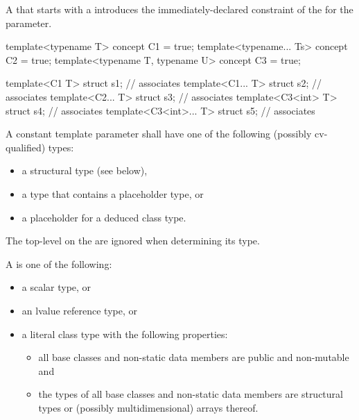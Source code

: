 \pnum
A  that starts with a 
introduces the immediately-declared constraint
of the  for the parameter.
\begin{example}
\begin{codeblock}
template<typename T> concept C1 = true;
template<typename... Ts> concept C2 = true;
template<typename T, typename U> concept C3 = true;

template<C1 T> struct s1;               // associates 
template<C1... T> struct s2;            // associates 
template<C2... T> struct s3;            // associates 
template<C3<int> T> struct s4;          // associates 
template<C3<int>... T> struct s5;       // associates 
\end{codeblock}
\end{example}

\pnum
A constant template parameter
shall have one of the following (possibly cv-qualified) types:
\begin{itemize}
\item a structural type (see below),
\item a type that contains a placeholder type, or
\item a placeholder for a deduced class type.
\end{itemize}
The top-level
on the
are ignored when determining its type.

\pnum
\label{term.structural.type}%
A  is one of the following:
\begin{itemize}
\item a scalar type, or
\item an lvalue reference type, or
\item a literal class type with the following properties:
\begin{itemize}
\item
all base classes and non-static data members are public and non-mutable and
\item
the types of all base classes and non-static data members are
structural types or (possibly multidimensional) arrays thereof.
\end{itemize}
\end{itemize}

